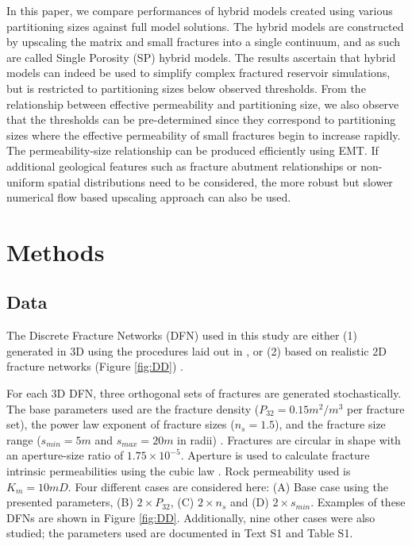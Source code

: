 \documentclass[draft]{agujournal2018}
\begin{document}
In this paper, we compare performances of hybrid models created using various partitioning sizes against full model solutions. The hybrid models are constructed by upscaling the matrix and small fractures into a single continuum, and as such are called Single Porosity (SP) hybrid models. The results ascertain that hybrid models can indeed be used to simplify complex fractured reservoir simulations, but is restricted to partitioning sizes below observed thresholds. From the relationship between effective permeability and partitioning size, we also observe that the thresholds can be pre-determined since they correspond to partitioning sizes where the effective permeability of small fractures begin to increase rapidly. The permeability-size relationship can be produced efficiently using EMT. If additional geological features such as fracture abutment relationships or non-uniform spatial distributions need to be considered, the more robust but slower numerical flow based upscaling approach can also be used.

\section{Methods}

\subsection{Data}
The Discrete Fracture Networks (DFN) used in this study are either (1) generated in 3D using the procedures laid out in \citet{Priest1993}, or (2) based on realistic 2D fracture networks (Figure \ref{fig:DD}) \citep{Bisdom2017}.

For each 3D DFN, three orthogonal sets of fractures are generated stochastically. The base parameters used are the fracture density ($P_{32}=0.15m^2/m^3$ per fracture set), the power law exponent of fracture sizes ($n_s=1.5$), and the fracture size range ($s_{min}=5m$ and $s_{max}=20m$ in radii) \citep{Bonnet2001, Dershowitz1992}. Fractures are circular in shape with an aperture-size ratio of $1.75\times 10^{-5}$. Aperture is used to calculate fracture intrinsic permeabilities using the cubic law \citep{Witherspoon1980}. Rock permeability used is $K_m=10mD$. Four different cases are considered here: (A) Base case using the presented parameters, (B) $2\times P_{32}$, (C) $2\times n_s$ and (D) $2\times s_{min}$. Examples of these DFNs are shown in Figure \ref{fig:DD}. Additionally, nine other cases were also studied; the parameters used are documented in Text S1 and Table S1.
\end{document}

